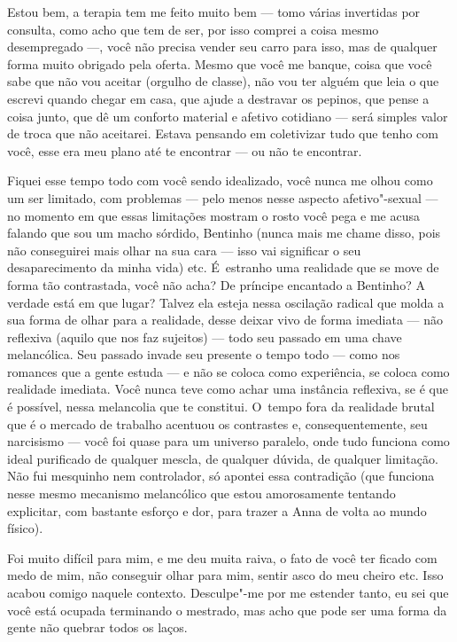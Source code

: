 Estou bem, a terapia tem me feito muito bem --- tomo várias invertidas
por consulta, como acho que tem de ser, por isso comprei a coisa mesmo
desempregado \mbox{---,} você não precisa vender seu carro para isso, mas de
qualquer forma muito obrigado pela oferta. Mesmo que você me banque,
coisa que você sabe que não vou aceitar (orgulho de classe), não vou ter
alguém que leia o que escrevi quando chegar em casa, que ajude a
destravar os pepinos, que pense a coisa junto, que dê um conforto
material e afetivo cotidiano --- será simples valor de troca que não
aceitarei. Estava pensando em coletivizar tudo que tenho com você, esse
era meu plano até te encontrar --- ou não te encontrar.

Fiquei esse tempo todo com você sendo idealizado, você nunca me olhou
como um ser limitado, com problemas --- pelo menos nesse aspecto
afetivo"-sexual --- no momento em que essas limitações mostram o rosto
você pega e me acusa falando que sou um macho sórdido, Bentinho (nunca
mais me chame disso, pois não conseguirei mais olhar na sua cara ---
isso vai significar o seu desaparecimento da minha vida) etc. É~estranho
uma realidade que se move de forma tão contrastada, você não acha? De
príncipe encantado a Bentinho? A verdade está em que lugar? Talvez ela
esteja nessa oscilação radical que molda a sua forma de olhar para a
realidade, desse deixar vivo de forma imediata --- não reflexiva (aquilo
que nos faz sujeitos) --- todo seu passado em uma chave melancólica. Seu
passado invade seu presente o tempo todo --- como nos romances que a
gente estuda --- e não se coloca como experiência, se coloca como
realidade imediata. Você nunca teve como achar uma instância reflexiva,
se é que é possível, nessa melancolia que te constitui. O~tempo fora da
realidade brutal que é o mercado de trabalho acentuou os contrastes e,
consequentemente, seu narcisismo --- você foi quase para um universo
paralelo, onde tudo funciona como ideal purificado de qualquer mescla,
de qualquer dúvida, de qualquer limitação. Não fui mesquinho nem
controlador, só apontei essa contradição (que funciona nesse mesmo
mecanismo melancólico que estou amorosamente tentando explicitar, com
bastante esforço e dor, para trazer a Anna de volta ao mundo físico).

Foi muito difícil para mim, e me deu muita raiva, o fato de você ter
ficado com medo de mim, não conseguir olhar para mim, sentir asco do meu
cheiro etc. Isso acabou comigo naquele contexto. Desculpe"-me por me
estender tanto, eu sei que você está ocupada terminando o mestrado, mas
acho que pode ser uma forma da gente não quebrar todos os laços.

